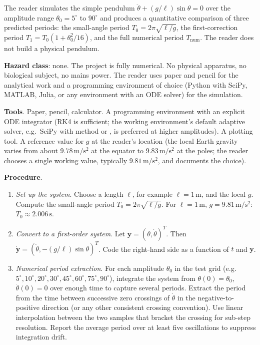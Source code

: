 \begin{project}
The reader simulates the simple pendulum $\ddot{\theta} +
(g/\ell)\sin\theta = 0$ over the amplitude range
$\theta_{0} = 5^{\circ}$ to $90^{\circ}$ and produces a quantitative
comparison of three predicted periods: the small-angle period
$T_{0} = 2\pi\sqrt{\ell/g}$, the first-correction period $T_{1} =
T_{0}(1 + \theta_{0}^{2}/16)$, and the full numerical period
$T_{\text{num}}$. The reader does not
build a physical pendulum.

\textbf{Hazard class}: none. The project is fully numerical. No
physical apparatus, no biological subject, no mains power. The
reader uses paper and pencil for the analytical work and a
programming environment of choice (Python with SciPy, MATLAB,
Julia, or any environment with an ODE solver) for the simulation.

\textbf{Tools}. Paper, pencil, calculator. A programming
environment with an explicit ODE integrator (RK4 is sufficient;
the working environment's default adaptive solver, e.g.\ SciPy
 with method  or , is
preferred at higher amplitudes). A plotting tool. A reference
value for $g$ at the reader's location (the local Earth gravity
varies from about $9.78\,\si{\meter\per\second\squared}$ at the
equator to $9.83\,\si{\meter\per\second\squared}$ at the poles;
the reader chooses a single working value, typically
$9.81\,\si{\meter\per\second\squared}$, and documents the choice).

\textbf{Procedure}.

\begin{enumerate}[leftmargin=*]
  \item \emph{Set up the system}. Choose a length $\ell$, for
    example $\ell = 1\,\si{\meter}$, and the local $g$. Compute
    the small-angle period $T_{0} = 2\pi\sqrt{\ell/g}$. For
    $\ell = 1\,\si{\meter}$, $g = 9.81\,\si{\meter\per\second
    \squared}$: $T_{0} \approx 2.006\,\si{\second}$.

  \item \emph{Convert to a first-order system}. Let $\mathbf{y} =
    (\theta, \dot\theta)^{T}$. Then $\dot{\mathbf{y}} =
    (\dot\theta, -(g/\ell)\sin\theta)^{T}$. Code the right-hand
    side as a function of $t$ and $\mathbf{y}$.

  \item \emph{Numerical period extraction}. For each amplitude
    $\theta_{0}$ in the test grid (e.g.\ $5^{\circ}, 10^{\circ},
    20^{\circ}, 30^{\circ}, 45^{\circ}, 60^{\circ}, 75^{\circ},
    90^{\circ}$), integrate the system from $\theta(0) =
    \theta_{0}$, $\dot\theta(0) = 0$ over enough time to capture
    several periods. Extract the period from the time between
    successive zero crossings of $\dot\theta$ in the negative-to-
    positive direction (or any other consistent crossing
    convention). Use linear interpolation between the two samples
    that bracket the crossing for sub-step resolution. Report the
    average period over at least five oscillations to suppress
    integration drift.


\end{enumerate}
\end{project}
